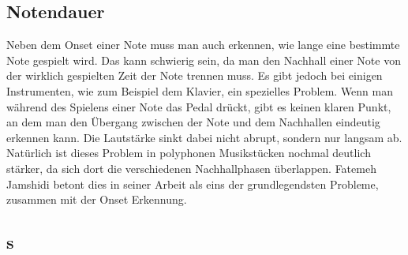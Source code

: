\subsection{Notendauer}
Neben dem Onset einer Note muss man auch erkennen, wie lange eine bestimmte Note gespielt wird.
Das kann schwierig sein, da man den Nachhall einer Note von der wirklich gespielten Zeit der Note trennen muss.
Es gibt jedoch bei einigen Instrumenten, wie zum Beispiel dem Klavier, ein spezielles Problem.
Wenn man während des Spielens einer Note das Pedal drückt, gibt es keinen klaren Punkt,
an dem man den Übergang zwischen der Note und dem Nachhallen eindeutig erkennen kann.
Die Lautstärke sinkt dabei nicht abrupt, sondern nur langsam ab.
Natürlich ist dieses Problem in polyphonen Musikstücken nochmal deutlich stärker,
da sich dort die verschiedenen Nachhallphasen überlappen.
Fatemeh Jamshidi betont dies in seiner Arbeit als eins der grundlegendsten Probleme, zusammen mit der Onset Erkennung.
\cite{jamshidi2024machine}

\subsection{s}




